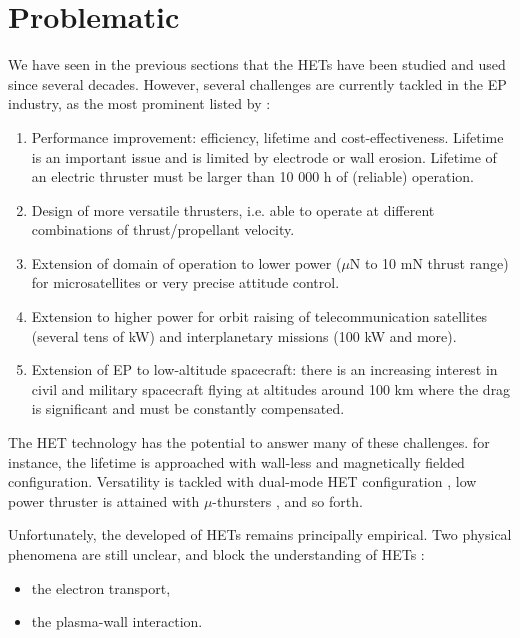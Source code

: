 
\section*{Problematic}
\label{sec-problematic}

We have seen in the previous sections that the \ac{HET}s have been studied and used since several decades.
However, several challenges are currently tackled in the \ac{EP} industry, as the most prominent listed by \citet{samukawa2012} \string:
\begin{enumerate}
  \item Performance improvement\string: efficiency, lifetime and cost-effectiveness.
   Lifetime is an important issue and is limited by electrode or wall erosion.
   Lifetime of an electric thruster must be larger than 10 000 h of (reliable) operation.
   \item  Design of more versatile thrusters, i.e. able to operate at different combinations of thrust/propellant velocity.
   \item  Extension of domain of operation to lower power ($\mu$N to 10 mN thrust range) for microsatellites or very precise attitude control.
   \item  Extension to higher power for orbit raising of telecommunication satellites (several tens of kW) and    interplanetary missions (100 kW and more).
   \item Extension of EP to low-altitude spacecraft\string: there is an increasing interest in civil and military spacecraft flying  at altitudes around 100 km where the drag is significant and must be constantly compensated.
\end{enumerate}

The \ac{HET} technology has the potential to answer many of these challenges.
for instance, the lifetime is approached with wall-less and magnetically fielded configuration.
Versatility is tackled with dual-mode \ac{HET} configuration \citep{boniface2017}, low power thruster is attained with $\mu$-thursters \citep{lascombes2018}, and so forth.

Unfortunately, the developed of \ac{HET}s remains principally empirical. 
Two physical phenomena are still unclear, and block the understanding of \ac{HET}s \citep{samukawa2012,adamovich2017}\string:
\begin{itemize}
  \item the electron transport,
  \item the plasma-wall interaction.
\end{itemize}

